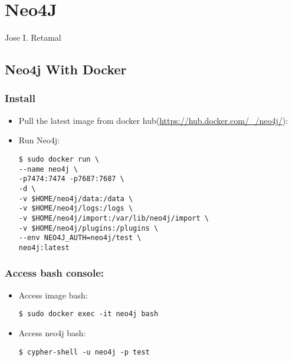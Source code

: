 \chapter{Neo4J}
Jose I. Retamal
\vskip 0.1in
\indent
\indent

\section {Neo4j With Docker}

\subsection{Install}
\begin{itemize}
\item Pull the latest image from docker hub(\url{https://hub.docker.com/_/neo4j/}):
	
	

	
	
\item Run Neo4j:
	
\begin{verbatim}
$ sudo docker run \
--name neo4j \
-p7474:7474 -p7687:7687 \
-d \
-v $HOME/neo4j/data:/data \
-v $HOME/neo4j/logs:/logs \
-v $HOME/neo4j/import:/var/lib/neo4j/import \
-v $HOME/neo4j/plugins:/plugins \
--env NEO4J_AUTH=neo4j/test \
neo4j:latest
\end{verbatim}

\end{itemize}	
\subsection{Access bash console:}	
\begin{itemize}
	\item Access image bash:
	
\begin{verbatim}
$ sudo docker exec -it neo4j bash
\end{verbatim}
	
	
	\item Access neo4j bash:
	
\begin{verbatim}
$ cypher-shell -u neo4j -p test
\end{verbatim}

\end{itemize}	
	

